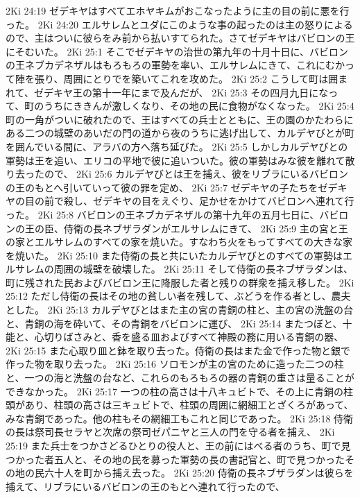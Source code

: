 2Ki 24:19  ゼデキヤはすべてエホヤキムがおこなったように主の目の前に悪を行った。
2Ki 24:20  エルサレムとユダにこのような事の起ったのは主の怒りによるので、主はついに彼らをみ前から払いすてられた。さてゼデキヤはバビロンの王にそむいた。
2Ki 25:1  そこでゼデキヤの治世の第九年の十月十日に、バビロンの王ネブカデネザルはもろもろの軍勢を率い、エルサレムにきて、これにむかって陣を張り、周囲にとりでを築いてこれを攻めた。
2Ki 25:2  こうして町は囲まれて、ゼデキヤ王の第十一年にまで及んだが、
2Ki 25:3  その四月九日になって、町のうちにききんが激しくなり、その地の民に食物がなくなった。
2Ki 25:4  町の一角がついに破れたので、王はすべての兵士とともに、王の園のかたわらにある二つの城壁のあいだの門の道から夜のうちに逃げ出して、カルデヤびとが町を囲んでいる間に、アラバの方へ落ち延びた。
2Ki 25:5  しかしカルデヤびとの軍勢は王を追い、エリコの平地で彼に追いついた。彼の軍勢はみな彼を離れて散り去ったので、
2Ki 25:6  カルデヤびとは王を捕え、彼をリブラにいるバビロンの王のもとへ引いていって彼の罪を定め、
2Ki 25:7  ゼデキヤの子たちをゼデキヤの目の前で殺し、ゼデキヤの目をえぐり、足かせをかけてバビロンへ連れて行った。
2Ki 25:8  バビロンの王ネブカデネザルの第十九年の五月七日に、バビロンの王の臣、侍衛の長ネブザラダンがエルサレムにきて、
2Ki 25:9  主の宮と王の家とエルサレムのすべての家を焼いた。すなわち火をもってすべての大きな家を焼いた。
2Ki 25:10  また侍衛の長と共にいたカルデヤびとのすべての軍勢はエルサレムの周囲の城壁を破壊した。
2Ki 25:11  そして侍衛の長ネブザラダンは、町に残された民およびバビロン王に降服した者と残りの群衆を捕え移した。
2Ki 25:12  ただし侍衛の長はその地の貧しい者を残して、ぶどうを作る者とし、農夫とした。
2Ki 25:13  カルデヤびとはまた主の宮の青銅の柱と、主の宮の洗盤の台と、青銅の海を砕いて、その青銅をバビロンに運び、
2Ki 25:14  またつぼと、十能と、心切りばさみと、香を盛る皿およびすべて神殿の務に用いる青銅の器、
2Ki 25:15  また心取り皿と鉢を取り去った。侍衛の長はまた金で作った物と銀で作った物を取り去った。
2Ki 25:16  ソロモンが主の宮のために造った二つの柱と、一つの海と洗盤の台など、これらのもろもろの器の青銅の重さは量ることができなかった。
2Ki 25:17  一つの柱の高さは十八キュビトで、その上に青銅の柱頭があり、柱頭の高さは三キュビトで、柱頭の周囲に網細工とざくろがあって、みな青銅であった。他の柱もその網細工もこれと同じであった。
2Ki 25:18  侍衛の長は祭司長セラヤと次席の祭司ゼパニヤと三人の門を守る者を捕え、
2Ki 25:19  また兵士をつかさどるひとりの役人と、王の前にはべる者のうち、町で見つかった者五人と、その地の民を募った軍勢の長の書記官と、町で見つかったその地の民六十人を町から捕え去った。
2Ki 25:20  侍衛の長ネブザラダンは彼らを捕えて、リブラにいるバビロンの王のもとへ連れて行ったので、
